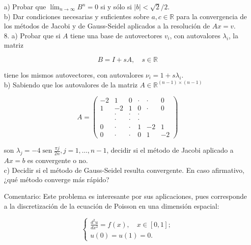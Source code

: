 \documentclass[10pt]{article}
\begin{document}
a) Probar que $\operatorname{lím}_{n \rightarrow \infty} B^{n}=0$ si y sólo si $|b|<\sqrt{2} / 2$.\\
b) Dar condiciones necesarias y suficientes sobre $a, c \in \mathbb{R}$ para la convergencia de los métodos de Jacobi y de Gauss-Seidel aplicados a la resolución de $A x=v$.\\
8. a) Probar que si $A$ tiene una base de autovectores $v_{i}$, con autovalores $\lambda_{i}$, la matriz

$$
B=I+s A, \quad s \in \mathbb{R}
$$

tiene los mismos autovectores, con autovalores $\nu_{i}=1+s \lambda_{i}$.\\
b) Sabiendo que los autovalores de la matriz $A \in \mathbb{R}^{(n-1) \times(n-1)}$

$$
A=\left(\begin{array}{cccccc}
-2 & 1 & 0 & \cdot & \cdot & 0 \\
1 & -2 & 1 & 0 & \cdot & 0 \\
& \cdot & \cdot & \cdot & & \\
& \cdot & \cdot & \cdot & & \\
0 & \cdot & \cdot & 1 & -2 & 1 \\
0 & \cdot & \cdot & 0 & 1 & -2
\end{array}\right)
$$

son $\lambda_{j}=-4 \operatorname{sen} \frac{\pi j}{2 n}, j=1, \ldots, n-1$, decidir si el método de Jacobi aplicado a $A x=b$ es convergente o no.\\
c) Decidir si el método de Gauss-Seidel resulta convergente. En caso afirmativo, ¿qué método converge más rápido?

Comentario: Este problema es interesante por sus aplicaciones, pues corresponde a la discretización de la ecuación de Poisson en una dimensión espacial:

$$
\left\{\begin{array}{l}
\frac{d^{2} u}{d x^{2}}=f(x), \quad x \in[0,1] ; \\
u(0)=u(1)=0 .
\end{array}\right.
$$
\end{document}
